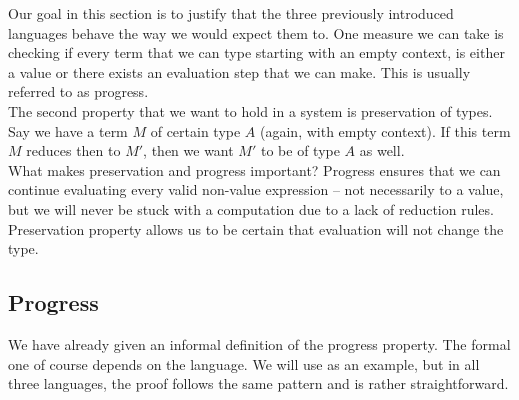Our goal in this section is to justify that the three previously introduced languages behave the way we would expect them to. One measure we can take is checking if every term that we can type starting with an empty context, is either a value or there exists an evaluation step that we can make. This is usually referred to as progress.\\
The second property that we want to hold in a system is preservation of types. Say we have a term $M$ of certain type $A$ (again, with empty context). If this term $M$ reduces then to $M'$, then we want $M'$ to be of type $A$ as well.\\

What makes preservation and progress important? Progress ensures that we can continue evaluating every valid non-value expression -- not necessarily to a value, but we will never be stuck with a computation due to a lack of reduction rules. Preservation property allows us to be certain that evaluation will not change the type.

\subsection {Progress}
We have already given an informal definition of the progress property. The formal one of course depends on the language. We will use \langL{} as an example, but in all three languages, the proof follows the same pattern and is rather straightforward.

